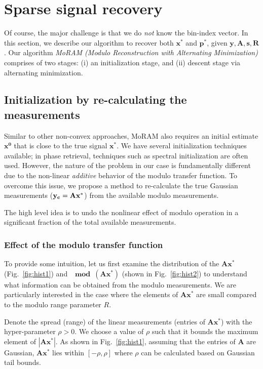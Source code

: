 \section{Sparse signal recovery}
\label{sec:algo}
Of course, the major challenge is that we do \emph{not} know the bin-index vector. In this section, we describe our algorithm to recover both $\mathbf{x^*}$ and $\mathbf{p^*}$, given $\mathbf{y, A, s, R}$.  Our algorithm \emph{MoRAM (Modulo Reconstruction with Alternating Minimization)} comprises of two stages: (i) an initialization stage, and (ii) descent stage via alternating minimization.

\subsection{Initialization by re-calculating the measurements}
\label{sec:init}

Similar to other non-convex approaches, MoRAM also requires an initial estimate $\mathbf{{x}^0}$ that is close to the true signal $\mathbf{{x}^*}$. We have several initialization techniques available; in phase retrieval, techniques such as spectral initialization are often used. However, the nature of the problem in our case is fundamentally different due to the non-linear \emph{additive} behavior of the modulo transfer function. To overcome this issue, we propose a method to re-calculate the true Gaussian measurements ($\mathbf{y_c}= \mathbf{Ax^*}$) from the available modulo measurements. 

The high level idea is to undo the nonlinear effect of modulo operation in a significant fraction of the total available measurements. %

\subsubsection{Effect of the modulo transfer function} 
\label{sec:modeff}
To provide some intuition, let us first examine the distribution of the $\mathbf{Ax^*}$(Fig.~\ref{fig:hist1}) and $\mathbf{\mod(\mathbf{Ax^*})}$ (shown in Fig.~\ref{fig:hist2}) to understand what information can be obtained from the modulo measurements. We are particularly interested in the case where the elements of $\mathbf{Ax^*}$ are small compared to the modulo range parameter $R$. 

Denote the spread (range) of the linear measurements (entries of $\mathbf{Ax^*}$) with the hyper-parameter $\rho > 0$. We choose a value of $\rho$ such that it bounds the maximum element of $|\mathbf{Ax^*}|$. As shown in Fig.~\ref{fig:hist1}, assuming that the entries of $\mathbf{A}$ are Gaussian, $\mathbf{Ax^*}$ lies within $[-\rho, \rho]$ where $\rho$ can be calculated based on Gaussian tail bounds.

